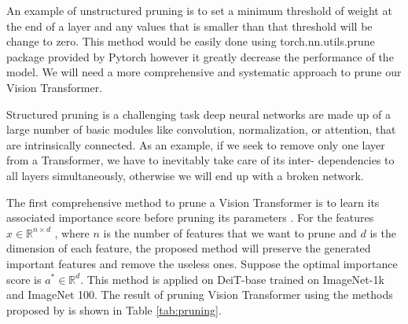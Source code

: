 An example of unstructured pruning is to set a minimum threshold of weight at the end of a layer and any values that is smaller than that threshold will be change to zero. This method would be easily done using torch.nn.utils.prune package provided by Pytorch however it greatly decrease the performance of the model. We will need a more comprehensive and systematic approach to prune our Vision Transformer.

Structured pruning is a challenging task deep neural networks are made up of a large number of basic modules like convolution, normalization, or attention, that are intrinsically connected. As an example, if we seek to remove only one layer from a Transformer, we have to inevitably take care of its inter-
dependencies to all layers simultaneously, otherwise we will end up with a broken network.

The first comprehensive method to prune a Vision Transformer is to learn its associated importance score before pruning its parameters \cite{pruning-vit}. For the features $x \in \mathbb{R}^{n \times d}$ , where $n$ is the number of features that we want to prune and $d$ is the dimension of each feature, the proposed method will preserve the generated important features and remove the useless ones. Suppose the optimal importance score is $a^* \in \mathbb{R}^d$. This method is applied on DeiT-base \cite{deit} trained on ImageNet-1k and ImageNet 100. The result of pruning Vision Transformer using the methods proposed by  is shown in Table \ref{tab:pruning}.

